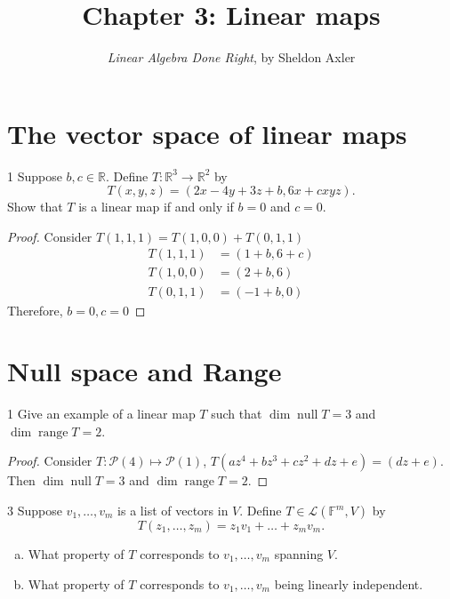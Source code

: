 \documentclass{article}
\title{\vspace{-2em}Chapter 3: Linear maps}
\author{\emph{Linear Algebra Done Right}, by Sheldon Axler}
\date{}
\newenvironment{problem}[1]{\begin{prob*}{#1}{}}{\end{prob*}}
\newcommand{\R}{\mathbb{R}}
\newcommand{\F}{\mathbb{F}}
\newcommand{\poly}{\mathcal{P}}
\newcommand{\Hom}{\mathcal{L}}
\DeclareMathOperator{\Null}{null}
\DeclareMathOperator{\Range}{range}
\begin{document}
\maketitle

\newpage
\tableofcontents
\newpage

\section{The vector space of linear maps}

\begin{problem}{1}
Suppose \(b,c \in \R\). Define \(T : \R^3 \to \R^2\) by \[
	T(x,y,z) = ( 2x - 4y + 3z + b, 6x + cxyz).\]
Show that $T$ is a linear map if and only if \(b = 0\) and \(c = 0\).
\end{problem}


\begin{proof}
	Consider \(T(1,1,1) = T(1,0,0) + T(0,1,1)\)
	\begin{align*}
		T(1,1,1) & = (1 + b, 6 + c) \\
		T(1,0,0) & = (2 + b, 6)     \\
		T(0,1,1) & = (-1 + b, 0)
	\end{align*}
	Therefore, \(b=0, c=0\)
\end{proof}

\section{Null space and Range}

\begin{problem}{1}
Give an example of a linear map $T$ such that \(\dim \Null T = 3\) and \(\dim \Range T = 2\).
\end{problem}

\begin{proof}
	Consider \(T : \poly (4) \mapsto \poly (1)\), \(T(a z^4 +b z^3 + c z^2 + d z + e) = (d z + e)\). Then \(\dim \Null T = 3\) and \(\dim \Range T = 2\).
\end{proof}

\begin{problem}{3}
Suppose \(v_1 , \dots, v_m\) is a list of vectors in $V$. Define \(T \in \Hom(\F^m, V)\) by \[
	T(z_1, \dots, z_m) = z_1v_1 + \dots + z_mv_m.\]
\begin{enumerate}[(a)]
	\item What property of $T$ corresponds to \(v_1, \dots, v_m\) spanning $V$.
	\item What property of $T$ corresponds to \(v_1, \dots, v_m\) being linearly independent.
\end{enumerate}
\end{problem}
\end{document}
